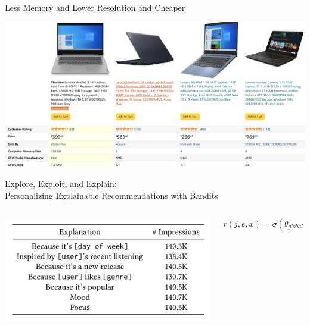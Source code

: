 \documentclass[11pt,aspectratio=169]{beamer}
\begin{document}
\begin{frame}

\begin{tcolorbox}[colback=info!5,colframe=info!80,title=Knowledge-based]
Less Memory and Lower Resolution and Cheaper
\end{tcolorbox}

\vfill

\begin{center}
\includegraphics[scale=0.2]{images/amazon2.png}
\end{center}

\end{frame}

\begin{frame}{Explore, Exploit, and Explain: \\ Personalizing Explainable Recommendations with Bandits \cite{EX3}}

\begin{columns}
\begin{column}{0.4\textwidth}
\begin{center}
\includegraphics[scale=0.4]{images/spotify.png}
\end{center}
\end{column}

\begin{column}{0.5\textwidth}
\[
r(j, e, x) = \sigma(\theta_{global} + \theta_{j} \times 1_j + \theta_e \times 1_e + \theta_x \times 1_x)
\]
\end{column}
\end{columns}

\end{frame}
\end{document}
